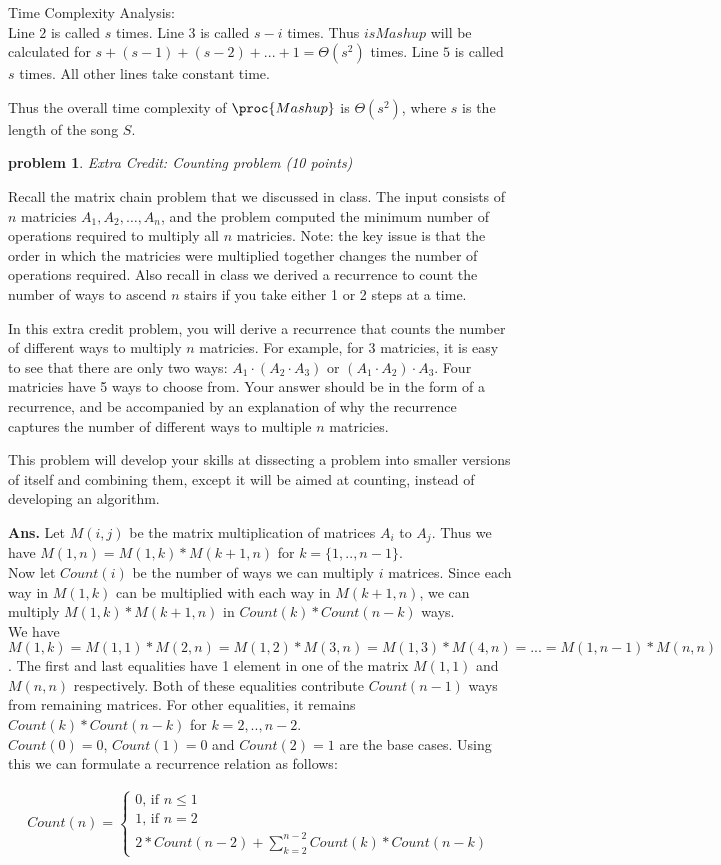 \documentclass[11pt]{article}
\newtheorem{problem}{\sc\color{cit}problem}
\begin{document}
Time Complexity Analysis:\\
Line $2$ is called $s$ times. Line $3$ is called $s-i$ times. Thus $isMashup$ will be calculated for $s+(s-1)+(s-2)+...+1=\Theta(s^2)$ times. Line $5$ is called $s$ times. All other lines take constant time.

Thus the overall time complexity of $\proc{Mashup}$ is $\Theta(s^2)$, where $s$ is the length of the song $S$.

\newpage

\begin{problem}Extra Credit: Counting problem (10 points)\end{problem}
Recall the matrix chain problem that we discussed in class. The input consists of $n$ matricies $A_1,A_2,\ldots,A_n$, and the problem computed the minimum number of operations required to multiply all $n$ matricies. Note: the key issue is that the order in which the matricies were multiplied together changes the number of operations required.  Also recall in class we derived a recurrence to count the number of ways to ascend $n$ stairs if you take either 1 or 2 steps at a time.

In this extra credit problem, you will derive a recurrence that counts the number of different ways to multiply $n$ matricies.  For example, for 3 matricies, it is easy to see that there are only two ways: $A_1 \cdot (A_2 \cdot A_3)$ or $(A_1 \cdot A_2)\cdot A_3$.  Four matricies have 5 ways to choose from.  Your answer should be in the form of a recurrence, and be accompanied by an explanation of why the recurrence captures the number of different ways to multiple $n$ matricies.

This problem will develop your skills at dissecting a problem into smaller versions of itself and combining them, except it will be aimed at counting, instead of developing an algorithm.

\hfill
   
\noindent \textbf{Ans.}
Let $M(i,j)$ be the matrix multiplication of matrices $A_i$ to $A_j$. Thus we have $M(1,n) = M(1,k)*M(k+1, n)$ for $k=\{1,..,n-1\}$. \\
Now let $Count(i)$ be the number of ways we can multiply $i$ matrices. Since each way in $M(1,k)$ can be multiplied with each way in $M(k+1,n)$, we can multiply $M(1,k)*M(k+1, n)$ in $Count(k)*Count(n-k)$ ways.\\

We have $M(1,k) = M(1,1)*M(2,n) = M(1,2)*M(3,n) = M(1,3)*M(4,n) = ... = M(1, n-1)*M(n,n)$. The first and last equalities have 1 element in one of the matrix $M(1,1)$ and $M(n,n)$ respectively. Both of these equalities contribute $Count(n-1)$ ways from remaining matrices. For other equalities, it remains $Count(k)*Count(n-k)$ for $k={2,..,n-2}$.\\
$Count(0) = 0$, $Count(1) = 0$ and $Count(2) = 1$ are the base cases. Using this we can formulate a recurrence relation as follows:

\begin{equation}
    \begin{split}
       Count(n) = 
       \begin{cases}
            0 \text{, if } n\leq1\\
            1 \text{, if } n=2\\
            2*Count(n-2)+\sum_{k=2}^{n-2} Count(k)*Count(n-k)
        \end{cases}
    \end{split}
\end{equation}
\end{document}
